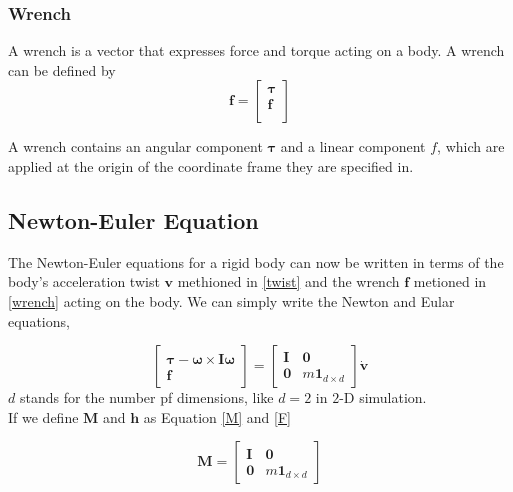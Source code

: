     \subsubsection{Wrench}
        A wrench is a vector that expresses force and torque acting on a body. A wrench can be defined by
        \begin{equation}
            \mathbf{f} = \left[ \begin{array}{c} \pmb{\tau} \\ \pmb{f} \\ \end{array} \right]
            \label{wrench} 
        \end{equation}

        A wrench contains an angular component $\pmb{\tau}$ and a linear component $f$, which are applied at the origin of the coordinate frame they are specified in.


\subsection{Newton-Euler Equation}
    The Newton-Euler equations for a rigid body can now be written in terms of the body's acceleration twist $\mathbf{v}$ methioned in \ref{twist} and the wrench $\mathbf{f}$ metioned in \ref{wrench} acting on the body. We can simply write the Newton and Eular equations,

    \begin{equation}
        \left[ \begin{array}{c} \pmb{\tau} - \pmb{\omega} \times \pmb{I} \pmb{\omega}\\ \pmb{f} \end{array}\right] = \left[ \begin{array}{cc} \pmb{I} & \pmb{0} \\ \pmb{0}& m\pmb{1}_{d\times d}\end{array} \right] \dot{\mathbf{v}}
    \end{equation}
    $d$ stands for the number pf dimensions, like $d=2$ in $2$-D simulation. \\

    If we define $\pmb{M}$ and $\mathbf{h}$ as Equation \ref{M} and \ref{F}

    \begin{equation}
        \pmb{M} = \left[ \begin{array}{cc} \pmb{I} & \pmb{0} \\ \pmb{0} & m\pmb{1}_{d \times d}\end{array} \right]
        \label{M}
    \end{equation}

